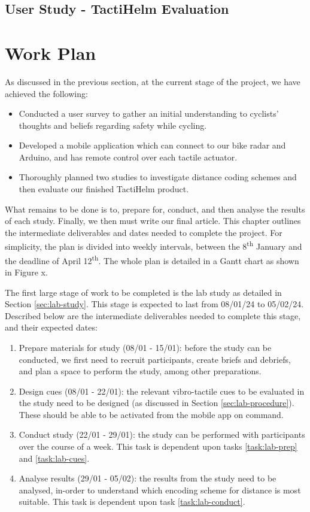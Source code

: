 \documentclass{interim}
\newcommand{\ts}{\textsuperscript}
\begin{document}
\subsection{User Study - TactiHelm Evaluation}\label{sec:user-study}

\section{Work Plan}
As discussed in the previous section, at the current stage of the project, we have achieved the following:
\begin{itemize}
    \item Conducted a user survey to gather an initial understanding to cyclists' thoughts and beliefs regarding safety while cycling.
    \item Developed a mobile application which can connect to our bike radar and Arduino, and has remote control over each tactile actuator.
    \item Thoroughly planned two studies to investigate distance coding schemes and then evaluate our finished TactiHelm product.
\end{itemize}
What remains to be done is to, prepare for, conduct, and then analyse the results of each study. Finally, we then must write our final article. This chapter outlines the intermediate deliverables and dates needed to complete the project. For simplicity, the plan is divided into weekly intervals, between the 8\ts{th} January and the deadline of April 12\ts{th}. The whole plan is detailed in a Gantt chart as shown in Figure x.

The first large stage of work to be completed is the lab study as detailed in Section \ref{sec:lab-study}. This stage is expected to last from 08/01/24 to 05/02/24. Described below are the intermediate deliverables needed to complete this stage, and their expected dates: 
\begin{enumerate}[label=1.\arabic*]
    \item Prepare materials for study (08/01 - 15/01): before the study can be conducted, we first need to recruit participants, create briefs and debriefs, and plan a space to perform the study, among other preparations.\label{task:lab-prep}
    \item Design cues (08/01 - 22/01): the relevant vibro-tactile cues to be evaluated in the study need to be designed (as discussed in Section \ref{sec:lab-procedure}). These should be able to be activated from the mobile app on command. \label{task:lab-cues}
    \item Conduct study (22/01 - 29/01): the study can be performed with participants over the course of a week. This task is dependent upon tasks \ref{task:lab-prep} and \ref{task:lab-cues}. \label{task:lab-conduct}
    \item Analyse results (29/01 - 05/02): the results from the study need to be analysed, in-order to understand which encoding scheme for distance is most suitable. This task is dependent upon task \ref{task:lab-conduct}.
\end{enumerate}
\end{document}
